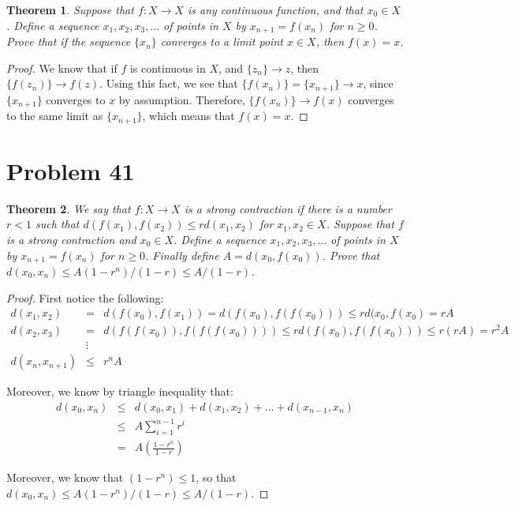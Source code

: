\documentclass[psamsfonts]{amsart}
\newtheorem{thm}{Theorem}[section]
\theoremstyle{definition}
\theoremstyle{remark}
\numberwithin{equation}{section}
\begin{document}
\begin{thm}
Suppose that $f: X \to X$ is any continuous function, and that $x_0 \in X$. Define a sequence $x_1, x_2, x_3, \ldots$ of points in $X$ by $x_{n+1} = f(x_n)$ for $n \geq 0$. Prove that if the sequence $\{ x_n \}$ converges to a limit point $x \in X$, then $f(x) = x$. 
\end{thm}

\begin{proof}
We know that if $f$ is continuous in $X$, and $\{ z_n \} \to z$, then $\{ f(z_n ) \} \to f(z)$. Using this fact, we see that $\{ f(x_n) \} = \{ x_{n+1} \} \to x$, since $\{x_{n+1 } \}$ converges to $x$ by assumption. Therefore, $\{ f(x_n ) \} \to f(x)$ converges to the same limit as $\{ x_{n+1} \}$, which means that $f(x) = x$. 
\end{proof} 

\section{Problem 41}

\begin{thm}
We say that $f: X \to X$ is a strong contraction if there is a number $r < 1$ such that $d(f(x_1),f(x_2)) \leq r d(x_1,x_2)$ for $x_1, x_2 \in X$. Suppose that $f$ is a strong contraction and $x_0 \in X$. Define a sequence $x_1, x_2, x_3, \ldots$ of points in $X$ by $x_{n+1} = f(x_n)$ for $n \geq 0$. Finally define $A = d(x_0, f(x_0))$. Prove that $d(x_0,x_n) \leq A(1-r^n)/(1-r) \leq A/(1-r)$. 
\end{thm}

\begin{proof}
First notice the following:
\begin{eqnarray}
d(x_1,x_2) &=& d(f(x_0), f(x_1)) = d(f(x_0), f( f(x_0))) \leq r d(x_0, f(x_0) = r A \\
d(x_2,x_3) &=& d(f(f(x_0)), f(f(f(x_0)))) \leq r d(f(x_0), f(f(x_0))) \leq r (rA) = r^2 A \\
&\vdots& \\
d(x_n,x_{n+1}) &\leq& r^n A
\end{eqnarray}

Moreover, we know by triangle inequality that:
\begin{eqnarray}
d(x_0, x_n) &\leq& d(x_0,x_1) + d(x_1, x_2) + \ldots + d(x_{n-1}, x_n ) \\
&\leq& A \sum_{i=1}^{n-1} r^i \\
&=& A \left( \frac{1-r^n}{1-r} \right) 
\end{eqnarray}

Moreover, we know that $(1-r^n) \leq 1$, so that $d(x_0, x_n) \leq A(1-r^n)/(1-r) \leq A/(1-r)$. 
\end{proof}
\end{document}
